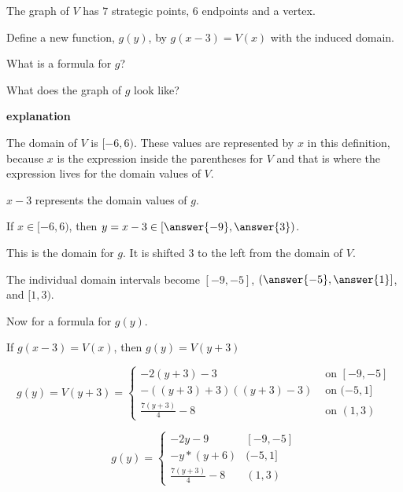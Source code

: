 \documentclass{ximera}
\begin{document}
\begin{example}
The graph of $V$ has $7$ strategic points, $6$ endpoints and a vertex.










Define a new function, $g(y)$, by $g(x-3) = V(x)$ with the induced domain.



What is a formula for $g$?

What does the graph of $g$ look like?



\textbf{\textcolor{red!75!green}{explanation}} 



The domain of $V$ is $[-6, 6)$.  These values are represented by $x$ in this definition, because $x$ is the expression inside the parentheses for $V$ and that is where the expression lives for the domain values of $V$.

$x-3$ represents the domain values of $g$.   

If $x \in [-6, 6)$, then $y = x-3 \in \left[\answer{-9}, \answer{3}\right)$.  


This is the domain for $g$.  It is shifted $3$ to the left from the domain of $V$.  

The individual domain intervals become $[-9, -5]$, $\left(\answer{-5}, \answer{1}\right]$, and $[1, 3)$.



Now for a formula for $g(y)$.

If $g(x-3) = V(x)$, then $g(y) = V(y+3)$



\[
g(y) = V(y+3) = 
\begin{cases}
  -2(y+3)-3 & \text{ on } [-9, -5]   \\
  -((y+3)+3)((y+3)-3) & \text{ on } (-5, 1]  \\
  \frac{7(y+3)}{4} - 8 & \text{ on } (1, 3)
\end{cases}
\]





\[
g(y) = 
\begin{cases}
  -2y - 9 &  [-9, -5]   \\
  -y*(y+6) &  (-5, 1]  \\
  \frac{7(y+3)}{4} - 8 &  (1, 3)
\end{cases}
\]










\end{example}
\end{document}
